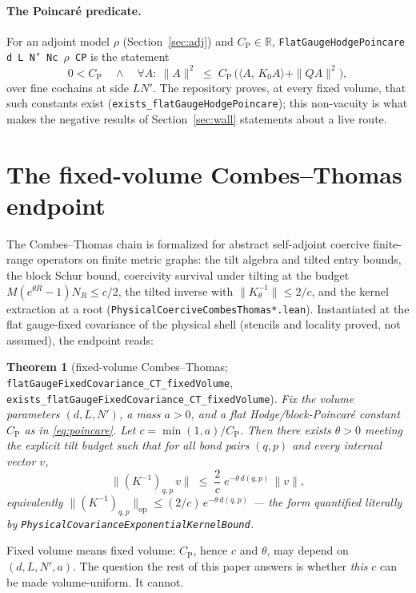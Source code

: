 \documentclass[11pt]{article}
\newtheorem{theorem}{Theorem}[section]
\theoremstyle{definition}
\newcommand{\lean}[1]{\texttt{#1}}
\newcommand{\R}{\mathbb{R}}
\newcommand{\CP}{C_{\mathrm{P}}}
\newcommand{\inn}[2]{\langle #1,\, #2\rangle}
\begin{document}
\paragraph{The Poincar\'e predicate.}  For an adjoint model $\rho$
(Section~\ref{sec:adj}) and $\CP\in\R$,
\lean{FlatGaugeHodgePoincare d L N' Nc $\rho$ CP} is the statement
\begin{equation}\label{eq:poincare}
0 < \CP \quad\wedge\quad
\forall A:\ \|A\|^2 \;\le\; \CP\,\bigl(\inn{A}{K_0A} + \|QA\|^2\bigr),
\end{equation}
over fine cochains at side $LN'$.  The repository proves, at every fixed
volume, that such constants exist
(\lean{exists\_flatGaugeHodgePoincare}); this non-vacuity is what makes
the negative results of Section~\ref{sec:wall} statements about a live
route.

\section{The fixed-volume Combes--Thomas endpoint}\label{sec:ct}

The Combes--Thomas chain is formalized for abstract self-adjoint
coercive finite-range operators on finite metric graphs: the tilt
algebra and tilted entry bounds, the block Schur bound, coercivity
survival under tilting at the budget
$M(e^{\theta R}-1)N_R \le c/2$, the tilted inverse with
$\|K_\theta^{-1}\|\le 2/c$, and the kernel extraction at a root
(\lean{PhysicalCoerciveCombesThomas*.lean}).  Instantiated at the flat
gauge-fixed covariance of the physical shell (stencils and locality
proved, not assumed), the endpoint reads:

\begin{theorem}[fixed-volume Combes--Thomas;
\lean{flatGaugeFixedCovariance\_CT\_fixedVolume},
\lean{exists\_flatGaugeFixedCovariance\_CT\_fixedVolume}]
Fix the volume parameters $(d,L,N')$, a mass $a>0$, and a flat
Hodge/block-Poincar\'e constant $\CP$ as in \eqref{eq:poincare}.  Let
$c=\min(1,a)/\CP$.  Then there exists $\theta>0$ meeting the explicit
tilt budget such that for all bond pairs $(q,p)$ and every internal
vector $v$,
\[
\bigl\|(K^{-1})_{q,p}\, v\bigr\| \;\le\; \frac{2}{c}\;
e^{-\theta\, d(q,p)}\,\|v\|,
\]
equivalently
$\|(K^{-1})_{q,p}\|_{\mathrm{op}} \le (2/c)\,e^{-\theta\,d(q,p)}$ ---
the form quantified literally by
\lean{PhysicalCovarianceExponentialKernelBound}.
\end{theorem}

Fixed volume means fixed volume: $\CP$, hence $c$ and $\theta$, may
depend on $(d,L,N',a)$.  The question the rest of this paper answers is
whether \emph{this} $c$ can be made volume-uniform.  It cannot.
\end{document}
